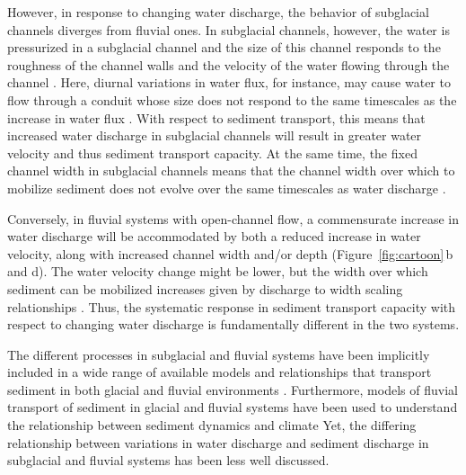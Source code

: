 \documentclass[11pt]{article}
\begin{document}
\begin{spacing}{1}
          However, in response to changing water discharge, the behavior of subglacial channels diverges from fluvial ones.
          In subglacial channels, however, the water is pressurized in a subglacial channel and the size of this channel responds to the roughness of the channel walls and the velocity of the water flowing through the channel \citep[Figure~\ref{fig:cartoon}\,a and c; e.g. ][]{rothlisberger1972}.
          Here, diurnal variations in water flux, for instance, may cause water to flow through a conduit whose size does not respond to the same timescales as the increase in water flux \citep{rothlisberger1972}.
          With respect to sediment transport, this means that increased water discharge in subglacial channels will result in greater water velocity and thus sediment transport capacity.
          At the same time, the fixed channel width in subglacial channels means that the channel width over which to mobilize sediment does not evolve over the same timescales as water discharge \citep[e.g.][]{werder2010}.
          
          Conversely, in fluvial systems with open-channel flow, a commensurate increase in water discharge will be accommodated by both a reduced increase in water velocity, along with increased channel width and/or depth (Figure~\ref{fig:cartoon}\,b and d).
          The water velocity change might be lower, but the width over which sediment can be mobilized increases given by discharge to width scaling relationships \citep{yalin1992}.
          Thus, the systematic response in sediment transport capacity with respect to changing water discharge is fundamentally different in the two systems.
        
          The different processes in subglacial and fluvial systems have been implicitly included in a wide range of available models and relationships that transport sediment in both glacial and fluvial environments \citep[e.g.][]{yalin1992,walder1994,beaud2018,wickert2019}.
          Furthermore, models of fluvial transport of sediment in glacial and fluvial systems have been used to understand the relationship between sediment dynamics and climate \citep[e.g.][]{tucker1997,delaney2020}
          Yet, the differing relationship between variations in water discharge and sediment discharge in subglacial and fluvial systems  has been less well discussed.
        

\end{spacing}
\end{document}
